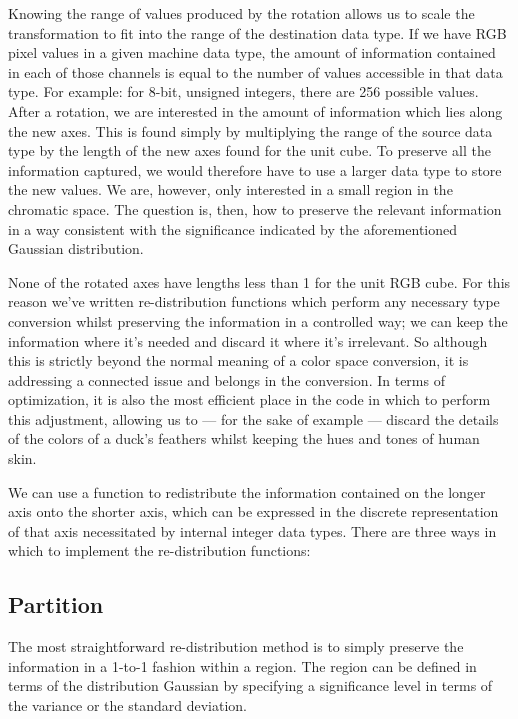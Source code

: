 Knowing the range of values produced by the rotation allows us to scale the transformation to fit into the range of the destination data type. If we have RGB pixel values in a given machine data type, the amount of information contained in each of those channels is equal to the number of values accessible in that data type. For example: for 8-bit, unsigned integers, there are 256 possible values. After a rotation, we are interested in the amount of information which lies along the new axes. This is found simply by multiplying the range of the source data type by the length of the new axes found for the unit cube. To preserve all the information captured, we would therefore have to use a larger data type to store the new values. We are, however, only interested in a small region in the chromatic space. The question is, then, how to preserve the relevant information in a way consistent with the significance indicated by the aforementioned Gaussian distribution.


None of the rotated axes have lengths less than 1 for the unit RGB cube. For this reason we've written re-distribution functions which perform any necessary type conversion whilst preserving the information in a controlled way; we can keep the information where it's needed and discard it where it's irrelevant. So although this is strictly beyond the normal meaning of a color space conversion, it is addressing a connected issue and belongs in the conversion. In terms of optimization, it is also the most efficient place in the code in which to perform this adjustment, allowing us to --- for the sake of example --- discard the details of the colors of a duck's feathers whilst keeping the hues and tones of human skin.

We can use a function to redistribute the information contained on the longer axis onto the shorter axis, which can be expressed in the discrete representation of that axis necessitated by internal integer data types. There are three ways in which to implement the re-distribution functions:

\subsection{Partition}\label{sec:Partition}

The most straightforward re-distribution method is to simply preserve the information in a 1-to-1 fashion within a region. The region can be defined in terms of the distribution Gaussian by specifying a significance level in terms of the variance or the standard deviation.


